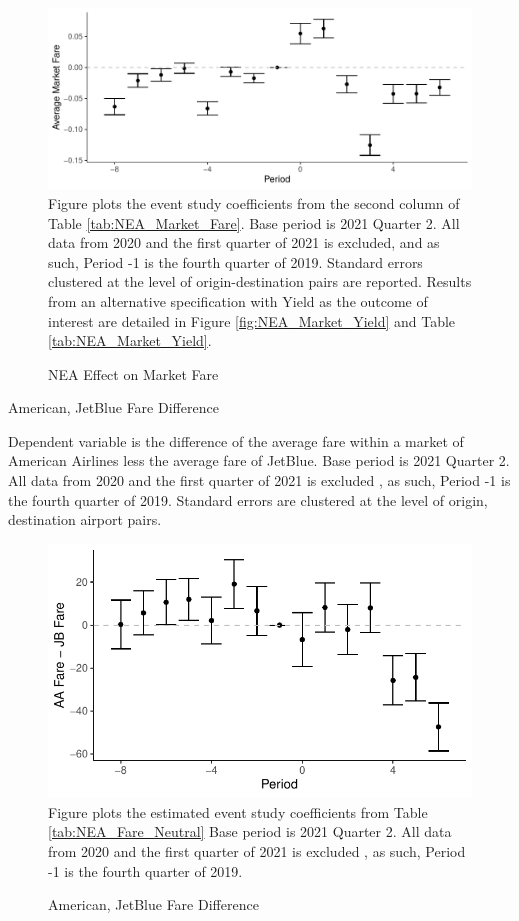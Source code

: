 \documentclass{article}
\begin{document}
\begin{appendices}
        \begin{figure}
		\caption{NEA Effect on Market Fare}
		\label{fig:NEA_Market_Fare}
		\includegraphics[width = \linewidth]{NEA_Market_Fare_Graph.pdf}
		\footnotesize{Figure plots the event study coefficients from the second column of Table \ref{tab:NEA_Market_Fare}. Base period is 2021 Quarter 2. All data from 2020 and the first quarter of 2021 is excluded, and as such, Period -1 is the fourth quarter of 2019. Standard errors clustered at the level of origin-destination pairs are reported. Results from an alternative specification with Yield as the outcome of interest are detailed in Figure \ref{fig:NEA_Market_Yield} and Table \ref{tab:NEA_Market_Yield}.}
	\end{figure}

	
	\begin{table}
		\caption{American, JetBlue Fare Difference}
		\label{tab:NEA_Fare_Neutral}
		
		\footnotesize{Dependent variable is the difference of the average fare within a market of American Airlines less the average fare of JetBlue. Base period is 2021 Quarter 2. All data from 2020 and the first quarter of 2021 is excluded , as such,  Period -1 is the fourth quarter of 2019. Standard errors are clustered at the level of origin, destination airport pairs.}
	\end{table}
	
	\begin{figure}
		\caption{American, JetBlue Fare Difference}
		\label{fig:NEA_Fare_Neutral}
		\includegraphics[width = \linewidth]{NEA_Price_Neutrality_Graph}
		\footnotesize{Figure plots the estimated event study coefficients from Table \ref{tab:NEA_Fare_Neutral} Base period is 2021 Quarter 2. All data from 2020 and the first quarter of 2021 is excluded , as such,  Period -1 is the fourth quarter of 2019.}
	\end{figure}
	

\end{appendices}
\end{document}
